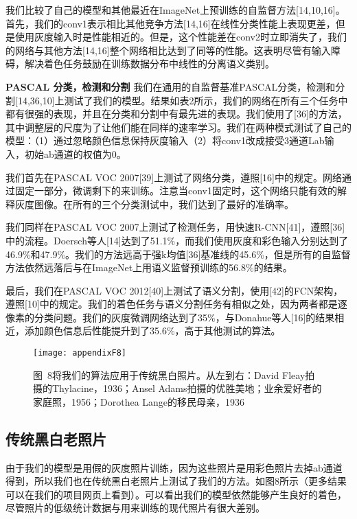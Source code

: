 我们比较了自己的模型和其他最近在ImageNet上预训练的自监督方法[14,10,16]。	首先，我们的conv1表示相比其他竞争方法[14,16]在线性分类性能上表现更差，但是使用灰度输入时是性能相近的。但是，这个性能差在conv2时立即消失了，我们的网络与其他方法[14,16]整个网络相比达到了同等的性能。这表明尽管有输入障碍，解决着色任务鼓励在训练数据分布中线性的分离语义类别。

\textbf{PASCAL 分类，检测和分割 } 我们在通用的自监督基准PASCAL分类，检测和分割[14,36,10]上测试了我们的模型。结果如表2所示，我们的网络在所有三个任务中都有很强的表现，并且在分类和分割中有最先进的表现。我们使用了[36]的方法，其中调整层的尺度为了让他们能在同样的速率学习。我们在两种模式测试了自己的模型：（1）通过忽略颜色信息保持灰度输入（2）将conv1改成接受3通道Lab输入，初始ab通道的权值为0。

我们首先在PASCAL VOC 2007[39]上测试了网络分类，遵照[16]中的规定。网络通过固定一部分，微调剩下的来训练。注意当conv1固定时，这个网络只能有效的解释灰度图像。在所有的三个分类测试中，我们达到了最好的准确率。

我们同样在PASCAL VOC 2007上测试了检测任务，用快速R-CNN[41]，遵照[36]中的流程。Doersch等人[14]达到了51.1\%，而我们使用灰度和彩色输入分别达到了46.9\%和47.9\%。我们的方法远高于强k均值[36]基准线的45.6\%，但是所有的自监督方法依然远落后与在ImageNet上用语义监督预训练的56.8\%的结果。

最后，我们在PASCAL VOC 2012[40]上测试了语义分割，使用[42]的FCN架构，遵照[10]中的规定。我们的着色任务与语义分割任务有相似之处，因为两者都是逐像素的分类问题。我们的灰度微调网络达到了35\%，与Donahue等人[16]的结果相近，添加颜色信息后性能提升到了35.6\%，高于其他测试的算法。

\begin{figure}[h]
  \centering
  \texttt{[image: appendixF8]}
  \caption*{图~8\quad 将我们的算法应用于传统黑白照片。从左到右：David Fleay拍摄的Thylacine，1936；Ansel Adams拍摄的优胜美地；业余爱好者的家庭照，1956；Dorothea Lange的移民母亲，1936}
  \label{tab:badfigure10}
\end{figure}

\subsection{传统黑白老照片}

由于我们的模型是用假的灰度照片训练，因为这些照片是用彩色照片去掉ab通道得到，所以我们也在传统黑白老照片上测试了我们的方法。如图8所示（更多结果可以在我们的项目网页上看到）。可以看出我们的模型依然能够产生良好的着色，尽管照片的低级统计数据与用来训练的现代照片有很大差别。

